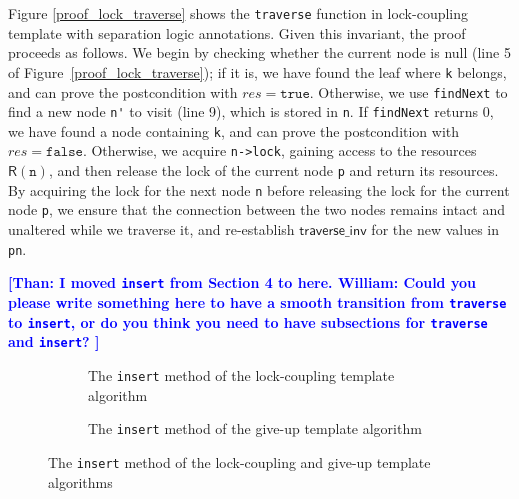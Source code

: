 \documentclass[a4paper,UKenglish,cleveref, autoref, thm-restate]{lipics-v2021}
\newcommand{\than}[1]{\textbf{\textcolor{blue}{[Than: #1]}}}
\newcommand{\wm}[1]{\textbf{\textcolor{violet}{[William: #1]}}}
\begin{document}
Figure \ref{proof_lock_traverse} shows the \texttt{traverse} function in lock-coupling template with separation logic annotations. Given this invariant, the proof proceeds as follows. %
We begin by checking whether the current node is null (line 5 of Figure~\ref{proof_lock_traverse}); if it is, we have found the leaf where \lstinline{k} belongs, and can prove the postcondition with $\mathit{res} = \texttt{true}$. Otherwise, we use \lstinline{findNext} to find a new node \lstinline{n'} to visit (line 9), which is stored in \lstinline{n}. If \lstinline{findNext} returns 0, we have found a node containing \lstinline{k}, and can prove the postcondition with $\mathit{res} = \mathtt{false}$. Otherwise, we acquire \lstinline{n->lock}, gaining access to the resources $\mathsf{R}(\texttt{n})$, and then release the lock of the current node \texttt{p} and return its resources. %
By acquiring the lock for the next node \texttt{n} before releasing the lock for the current node \texttt{p}, we ensure that the connection between the two nodes remains intact and unaltered while we traverse it, and re-establish $\mathsf{traverse\_inv}$ for the new values in \lstinline{pn}. 

\than{I moved \texttt{insert} from Section 4 to here. William: Could you please write something here to have a smooth transition from \texttt{traverse} to \texttt{insert}, or do you think you need to have subsections for \texttt{traverse} and \texttt{insert}? }

\begin{figure}[h]
	\begin{subfigure}[t]{0.48\textwidth}
		 
		\caption{The \lstinline{insert} method of the lock-coupling template algorithm}
		\label{insert_lock}	
	\end{subfigure}\qquad
	\begin{subfigure}[t]{0.48\textwidth}
		 
		\caption{The \lstinline{insert} method of the give-up template algorithm}
		\label{insert_giveup}
	\end{subfigure} 
	\caption{The \lstinline{insert} method of the lock-coupling and give-up template algorithms}
	\label{insert_lock_giveup} 
\end{figure}
\end{document}
